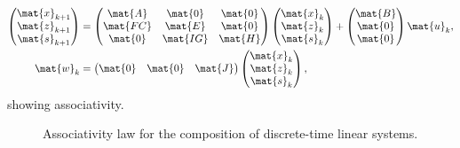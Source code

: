 \begin{equation*}
    \label{eq:dlin-7}
    \begin{aligned}
        \begin{pmatrix}
            \mat{x}_{k+1} \\
            \mat{z}_{k+1} \\
            \mat{s}_{k+1}
        \end{pmatrix} & =
        \begin{pmatrix}
            \mat{A}  & \mat{0}  & \mat{0} \\
            \mat{FC} & \mat{E}  & \mat{0} \\
            \mat{0}  & \mat{IG} & \mat{H}
        \end{pmatrix}
        \begin{pmatrix}
            \mat{x}_k \\ \mat{z}_k\\ \mat{s}_k
        \end{pmatrix}+
        \begin{pmatrix}
            \mat{B} \\ \mat{0}\\ \mat{0}
        \end{pmatrix}\mat{u}_k, \\
        \mat{w}_k                         & =
        \begin{pmatrix}
            \mat{0} & \mat{0} & \mat{J}
        \end{pmatrix}
        \begin{pmatrix}
            \mat{x}_k \\ \mat{z}_k\\ \mat{s}_k
        \end{pmatrix},
    \end{aligned}
\end{equation*}
showing associativity.

\begin{figure}[tbh]
    \centering
    \prflinepadbefore=5pt
    \prflinepadafter=5pt
    {
    }
    \caption{Associativity law for the composition of discrete-time linear systems. }
    \label{fig:ass_dyn_syst}
\end{figure}
